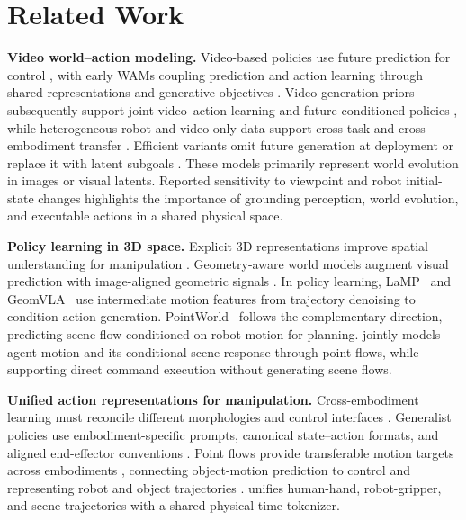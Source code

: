 \vspace{-0.3cm}

\section{Related Work}
\label{sec:related_work}
\vspace{-0.2cm}

\noindent\textbf{Video world--action modeling.}
Video-based policies use future prediction for control \citep{hu2024vpp},
with early WAMs coupling prediction and action learning through shared
representations and generative objectives
\citep{li2025uva,zhu2025uwm,cen2025worldvla,xu2025imaginative}.
Video-generation priors subsequently support joint video--action learning
and future-conditioned policies
\citep{genieenvisioner,shen2025videovla,bi2025motus,cosmospolicy,li2026lingbotva,wang2026eva},
while heterogeneous robot and video-only data support cross-task and
cross-embodiment transfer \citep{ye2026dreamzero,lingbotva2}.
Efficient variants omit future generation at deployment or replace it
with latent subgoals \citep{yuan2026fastwam,chen2026lawam}.
These models primarily represent world evolution in images or visual
latents. Reported sensitivity to viewpoint and robot initial-state changes
\citep{zhang2026wamgeneralization,hong2026walqr} highlights the importance
of grounding perception, world evolution, and executable actions in a
shared physical space.

\noindent\textbf{Policy learning in 3D space.}
Explicit 3D representations improve spatial understanding for manipulation
\citep{shridhar2023peract,ze2024threediffusion,zhen2024threedvla,qu2025spatialvla}.
Geometry-aware world models augment visual prediction with image-aligned
geometric signals \citep{zhen2025tesseract,guo2026xwam,zhao2026rynnworld}.
In policy learning, LaMP~\citep{wang2026lamp} and
GeomVLA~\citep{xiong2026geomvla} use intermediate motion features from
trajectory denoising to condition action generation. PointWorld~\citep{huang2026pointworld}
follows the complementary direction, predicting scene flow conditioned
on robot motion for planning. \method{} jointly models agent motion and
its conditional scene response through point flows, while supporting
direct command execution without generating scene flows.

\noindent\textbf{Unified action representations for manipulation.}
Cross-embodiment learning must reconcile different morphologies and
control interfaces \citep{chi2024umi}. Generalist policies use
embodiment-specific prompts, canonical state--action formats, and aligned
end-effector conventions
\citep{liu2024rdt,zheng2025xvla,yuan2026qwenrobotmanip,xiaomi2026robotics1}.
Point flows provide transferable motion targets across embodiments
\citep{yuan2024generalflow,bharadhwaj2024track2act,xu2024im2flow2act},
connecting object-motion prediction to control
\citep{zhi2025threedflowaction,dharmarajan2025dream2flow} and representing
robot and object trajectories \citep{huang2026pointworld,lin2026chronoflow}.
\method{} unifies human-hand, robot-gripper, and scene trajectories with
a shared physical-time tokenizer.

